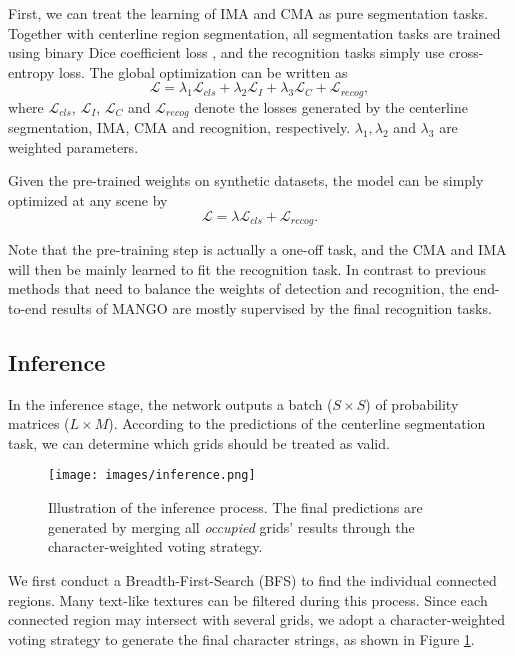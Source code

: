 \documentclass[letterpaper]{article} \usepackage{aaai21}  \usepackage{times}  \usepackage{helvet} \usepackage{courier}  \usepackage[hyphens]{url}  \usepackage{graphicx} \urlstyle{rm} \def\UrlFont{\rm}  \usepackage{natbib}  \usepackage{caption} \frenchspacing  \setlength{\pdfpagewidth}{8.5in}  \setlength{\pdfpageheight}{11in}  \usepackage{multirow}
\begin{document}
First, we can treat the learning of IMA and CMA as pure segmentation tasks. Together with centerline region segmentation, all segmentation tasks are trained using binary Dice coefficient loss \cite{milletari2016v}, and the recognition tasks simply use cross-entropy loss.
The global optimization can be written as
\begin{equation}
\mathcal{L} = \lambda_{1}\mathcal{L}_{cls} + \lambda_{2}\mathcal{L}_{I}+\lambda_{3}\mathcal{L}_{C} + \mathcal{L}_{recog},
\end{equation}
where $\mathcal{L}_{cls}$, $\mathcal{L}_{I}$, $\mathcal{L}_{C}$ and $\mathcal{L}_{recog}$ denote the losses generated by the centerline segmentation, IMA, CMA and recognition, respectively. $\lambda_{1},\lambda_{2}$ and $\lambda_{3}$ are weighted parameters.

Given the pre-trained weights on synthetic datasets, the model can be simply optimized at any scene by
\begin{equation}
\mathcal{L} = \lambda\mathcal{L}_{cls} + \mathcal{L}_{recog}.
\end{equation}

Note that the pre-training step is actually a one-off task, and the CMA and IMA will then be mainly learned to fit the recognition task. In contrast to previous methods that need to balance the weights of detection and recognition, the end-to-end results of MANGO are mostly supervised by the final recognition tasks.

\subsection{Inference}
In the inference stage, the network outputs a batch ($S\times S$) of probability matrices ($L\times M$). According to the predictions of the centerline segmentation task, we can determine which grids should be treated as valid.
\begin{figure}
\begin{center}
\texttt{[image: images/inference.png]}\\
\end{center}
\caption{
Illustration of the inference process. The final predictions are generated by merging all \emph{occupied} grids' results through the character-weighted voting strategy.
}
\label{fig:inference}
\end{figure}
We first conduct a Breadth-First-Search (BFS) to find the individual connected regions.
Many text-like textures can be filtered during this process.
Since each connected region may intersect with several grids, we adopt a character-weighted voting strategy to generate the final character strings, as shown in Figure \ref{fig:inference}.
\end{document}

